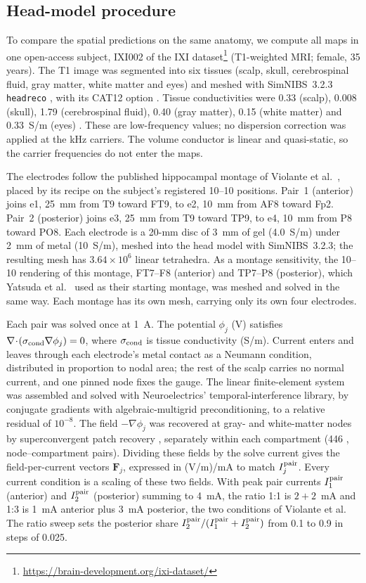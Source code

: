 \documentclass[11pt,a4paper]{article}
\newif\ifjne
\providecommand{\DIFaddtex}[1]{{\protect\color{blue} \sf #1}} %
\providecommand{\DIFadd}[1]{\texorpdfstring{\DIFaddtex{#1}}{#1}} %
\begin{document}
\fi
\ifjne
\subsection{\DIFadd{Head-model procedure}}\label{supp:fem-protocol}
\DIFadd{To compare the spatial predictions on the same anatomy, we compute all maps
in one open-access subject,
IXI002 of the IXI dataset}\footnote{\url{https://brain-development.org/ixi-dataset/}}
\DIFadd{(T1-weighted MRI; female, 35 years). The T1 image was segmented into six tissues
(scalp, skull, cerebrospinal fluid, gray matter, white matter and eyes) and meshed with
SimNIBS~3.2.3 \texttt{headreco} \cite{nielsen2018}, with its CAT12 option
\cite{gaser2024}. Tissue conductivities were 0.33 (scalp), 0.008 (skull), 1.79
(cerebrospinal fluid), 0.40 (gray matter), 0.15 (white matter) and 0.33~S/m (eyes)
\cite{salvador2025}. These are low-frequency values; no dispersion correction was
applied at the kHz carriers. The volume conductor is linear and quasi-static, so the
carrier frequencies do not enter the maps.
}

\DIFadd{The electrodes follow the published hippocampal montage of Violante et al.\
\cite{violante2023}, placed by its recipe on the subject's registered 10--10
positions. Pair~1 (anterior) joins e1, 25~mm from T9 toward FT9, to e2, 10~mm from AF8
toward Fp2. Pair~2 (posterior) joins e3, 25~mm from T9 toward TP9, to e4, 10~mm from P8
toward PO8. Each electrode is a 20-mm disc of 3~mm of gel (4.0~S/m) under 2~mm of metal
(10~S/m), meshed into the head model with SimNIBS~3.2.3; the resulting mesh has
$3.64\times10^6$ linear tetrahedra. As a montage sensitivity, the 10--10 rendering of
this montage, FT7--F8 (anterior) and TP7--P8 (posterior), which Yatsuda et al.\
\cite{yatsuda2024} used as their starting montage, was meshed and solved in the same
way. Each montage has its own mesh, carrying only its own four electrodes.
}

\DIFadd{Each pair was solved once at 1~A. The potential $\phi_j$ (V) satisfies
$\nabla\!\cdot\!(\sigma_{\rm cond}\nabla\phi_j)=0$, where
$\sigma_{\rm cond}$ is tissue conductivity (S/m). Current enters and leaves through each
electrode's metal contact as a Neumann condition, distributed in proportion to nodal
area; the rest of the scalp carries no normal current, and one pinned node fixes the
gauge. The linear finite-element system was assembled and solved with Neuroelectrics'
temporal-interference library, by conjugate gradients with algebraic-multigrid
preconditioning, to a relative residual of $10^{-8}$. The field
$-\nabla\phi_j$ was recovered at gray- and white-matter
nodes by superconvergent patch recovery \cite{zienkiewicz1992}, separately within each
compartment (446}{\DIFadd{,}}\DIFadd{877 node--compartment pairs). Dividing these fields by the solve
current gives the field-per-current vectors $\mathbf F_j$, expressed in
(V/m)/mA to match $I_j^{\rm pair}$. Every current condition is a scaling of these two fields.
With peak pair currents $I_1^{\rm pair}$ (anterior) and
$I_2^{\rm pair}$ (posterior) summing to 4~mA, the ratio 1:1 is $2+2$~mA and 1:3 is
1~mA anterior plus 3~mA posterior, the two conditions of Violante et al. The ratio sweep
sets the posterior share $I_2^{\rm pair}/(I_1^{\rm pair}+I_2^{\rm pair})$ from 0.1 to
0.9 in steps of 0.025.
}
\end{document}
